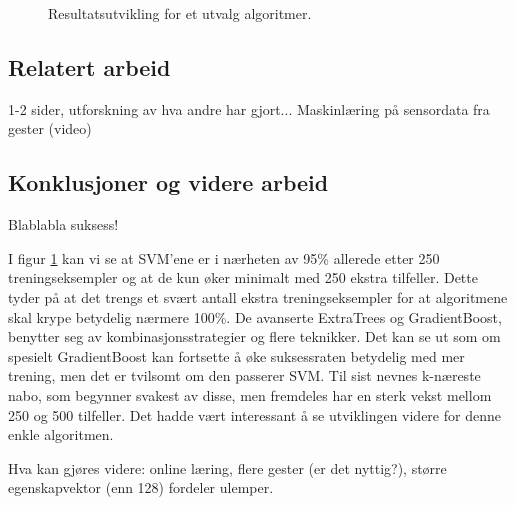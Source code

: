 \begin{figure}[h!]
\centering
{}
\label{figure:resultsgraf}
\caption{Resultatsutvikling for et utvalg algoritmer.}
\end{figure}

\subsection{Relatert arbeid}
{\color{red} 1-2 sider, utforskning av hva andre har gjort... Maskinlæring på sensordata fra gester (video)}

\subsection{Konklusjoner og videre arbeid}
Blablabla suksess!

I figur \ref{figure:resultsgraf} kan vi se at SVM'ene er i nærheten av 95\% allerede etter 250 treningseksempler og at de kun øker minimalt med 250 ekstra tilfeller. Dette tyder på at det trengs et svært antall ekstra treningseksempler for at algoritmene skal krype betydelig nærmere 100\%. De avanserte ExtraTrees og GradientBoost, benytter seg av kombinasjonsstrategier og flere teknikker. Det kan se ut som om spesielt GradientBoost kan fortsette å øke suksessraten betydelig med mer trening, men det er tvilsomt om den passerer SVM. Til sist nevnes k-næreste nabo, som begynner svakest av disse, men fremdeles har en sterk vekst mellom 250 og 500 tilfeller. Det hadde vært interessant å se utviklingen videre for denne enkle algoritmen.

Hva kan gjøres videre: online læring, flere gester (er det nyttig?), større egenskapvektor (enn 128) fordeler ulemper.



